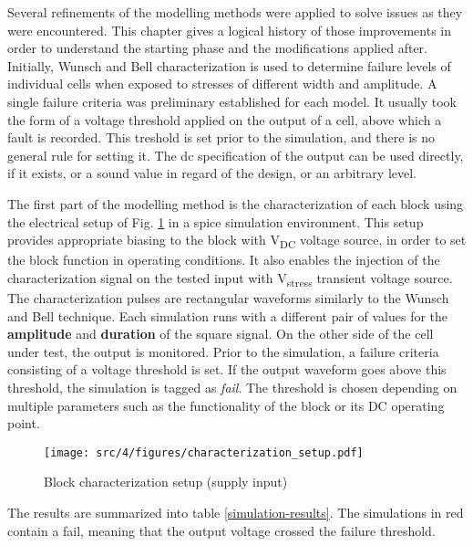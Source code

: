 Several refinements of the modelling methods were applied to solve issues as they were encountered.
This chapter gives a logical history of those improvements in order to understand the starting phase and the modifications applied after.
Initially, Wunsch and Bell characterization \cite{wunsch-bell} is used to determine failure levels of individual cells when exposed to stresses of different width and amplitude.
A single failure criteria was preliminary established for each model.
It usually took the form of a voltage threshold applied on the output of a cell, above which a fault is recorded.
This treshold is set prior to the simulation, and there is no general rule for setting it.
The \gls{dc} specification of the output can be used directly, if it exists, or a sound value in regard of the design, or an arbitrary level.

The first part of the modelling method is the characterization of each block using the electrical setup of Fig. \ref{block_function_cz} in a \gls{spice} simulation environment.
This setup provides appropriate biasing to the block with V\textsubscript{DC} voltage source, in order to set the block function in operating conditions.
It also enables the injection of the characterization signal on the tested input with V\textsubscript{stress} transient voltage source.
The characterization pulses are rectangular waveforms similarly to the Wunsch and Bell technique.
Each simulation runs with a different pair of values for the \textbf{amplitude} and \textbf{duration} of the square signal.
On the other side of the cell under test, the output is monitored.
Prior to the simulation, a failure criteria consisting of a voltage threshold is set.
If the output waveform goes above this threshold, the simulation is tagged as \textit{fail}.
The threshold is chosen depending on multiple parameters such as the functionality of the block or its DC operating point.

\begin{figure}[!h]
  \centering
  \texttt{[image: src/4/figures/characterization\_setup.pdf]}
  \caption{Block characterization setup (supply input)}
  \label{block_function_cz}
\end{figure}

The results are summarized into table \ref{simulation-results}.
The simulations in red contain a fail, meaning that the output voltage crossed the failure threshold.

